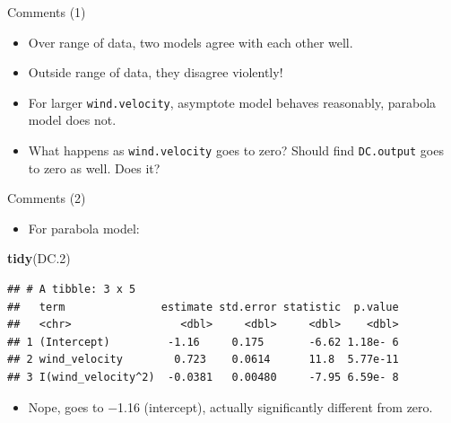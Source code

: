 \documentclass[ignorenonframetext,]{beamer}
\newenvironment{Shaded}{\begin{snugshade}}{\end{snugshade}}
\newcommand{\FloatTok}[1]{\textcolor[rgb]{0.00,0.00,0.81}{#1}}
\newcommand{\KeywordTok}[1]{\textcolor[rgb]{0.13,0.29,0.53}{\textbf{#1}}}
\newcommand{\NormalTok}[1]{#1}
\providecommand{\tightlist}{%
  \setlength{\itemsep}{0pt}\setlength{\parskip}{0pt}}
\begin{document}
\begin{frame}[fragile]{Comments (1)}
\protect\hypertarget{comments-1-1}{}

\begin{itemize}
\tightlist
\item
  Over range of data, two models agree with each other well.
\item
  Outside range of data, they disagree violently!
\item
  For larger \texttt{wind.velocity}, asymptote model behaves reasonably,
  parabola model does not.
\item
  What happens as \texttt{wind.velocity} goes to zero? Should find
  \texttt{DC.output} goes to zero as well. Does it?
\end{itemize}

\end{frame}

\begin{frame}[fragile]{Comments (2)}
\protect\hypertarget{comments-2-1}{}

\begin{itemize}
\tightlist
\item
  For parabola model:
\end{itemize}

\begin{Shaded}
\begin{Highlighting}[]
\KeywordTok{tidy}\NormalTok{(DC}\FloatTok{.2}\NormalTok{)}
\end{Highlighting}
\end{Shaded}

\begin{verbatim}
## # A tibble: 3 x 5
##   term               estimate std.error statistic  p.value
##   <chr>                 <dbl>     <dbl>     <dbl>    <dbl>
## 1 (Intercept)         -1.16     0.175       -6.62 1.18e- 6
## 2 wind_velocity        0.723    0.0614      11.8  5.77e-11
## 3 I(wind_velocity^2)  -0.0381   0.00480     -7.95 6.59e- 8
\end{verbatim}

\begin{itemize}
\tightlist
\item
  Nope, goes to −1.16 (intercept), actually significantly different from
  zero.
\end{itemize}

\end{frame}
\end{document}
